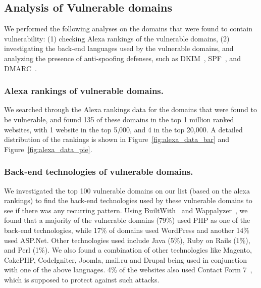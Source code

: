 \vspace{-2.5ex}
\subsection{Analysis of Vulnerable domains}
\vspace{-2.5ex}

We performed the following analyses on the domains
that were found to contain \ehi vulnerability: (1) checking Alexa
rankings of the vulnerable domains, (2) investigating the back-end
languages used by the vulnerable domains, and analyzing the presence
of anti-spoofing defenses, such as DKIM~\cite{allman2007domainkeys},
SPF~\cite{schlitt2006sender}, and DMARC~\cite{kucherawy2015domain}.


\vspace{-1.5ex}
\subsubsection{Alexa rankings of vulnerable domains.}
We searched through the Alexa rankings data\cite{alexa} for the domains that were found to be vulnerable, and found 135 of these domains in the top 1 million ranked websites, with 1 website in the top 5,000, and 4 in the top 20,000. A detailed distribution of the rankings is shown in Figure~\ref{fig:alexa_data_bar} and Figure~\ref{fig:alexa_data_pie}.


\vspace{-1.5ex}

\subsubsection{Back-end technologies of vulnerable domains.}
We investigated the top 100 vulnerable domains on our list (based on the alexa rankings) to find the back-end technologies used by these vulnerable domains to see if there was any recurring pattern. Using BuiltWith~\cite{builtwith} and Wappalyzer~\cite{wappalyzer}, we found that a majority of the vulnerable domains (79\%) used PHP as one of the back-end technologies, while 17\% of domains used WordPress and another 14\% used ASP.Net. Other technologies used include Java (5\%), Ruby on Rails (1\%), and Perl (1\%). We also found a combination of other technologies like Magento, CakePHP, CodeIgniter, Joomla, mail.ru and Drupal being used in conjunction with one of the above languages. 4\% of the websites also used Contact Form 7~\cite{CF7}, which is supposed to protect against such attacks.

